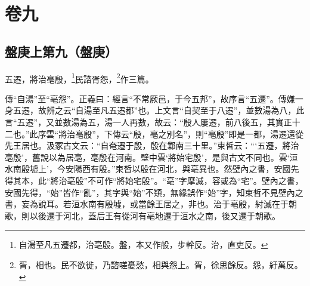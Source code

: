 

\chapter{卷九}


\section{盤庚上第九（盤庚）}


五遷，將治亳殷，\footnote{自湯至凡五遷都，治亳殷。盤，本又作般，步幹反。治，直吏反。}民諮胥怨，\footnote{胥，相也。民不欲徙，乃諮嗟憂愁，相與怨上。胥，徐思餘反。怨，紆萬反。}作三篇。

{\noindent\zhuan{}\fzbyks 傳“自湯”至“亳怨”。正義曰：經言“不常厥邑，于今五邦”，故序言“五遷”。傳嫌一身五遷，故辨之云“自湯至凡五遷都”也。上文言“自契至于八遷”，並數湯為八，此言“五遷”，又並數湯為五，湯一人再數，故云：“殷人屢遷，前八後五，其實正十二也。”此序雲“將治亳殷”，下傳云“殷，亳之別名”，則“亳殷”即是一都，湯遷還從先王居也。汲冢古文云：“自奄遷于殷，殷在鄴南三十里。”束晳云：“‘五遷，將治亳殷’，舊說以為居亳，亳殷在河南。壁中雲‘將始宅殷’，是與古文不同也。雲‘洹水南殷墟上’，今安陽西有殷。”束晳以殷在河北，與亳異也。然壁內之書，安國先得其本，此“將治亳殷”不可作“將始宅殷”。“亳”字摩滅，容或為“宅”。壁內之書，安國先得，“始”皆作“亂”，其字與“始”不類，無緣誤作“始”字，知束晳不見壁內之書，妄為說耳。若洹水南有殷墟，或當餘王居之，非也。治于亳殷，紂滅在于朝歌，則以後遷于河北，蓋后王有從河有亳地遷于洹水之南，後又遷于朝歌。 \par}

